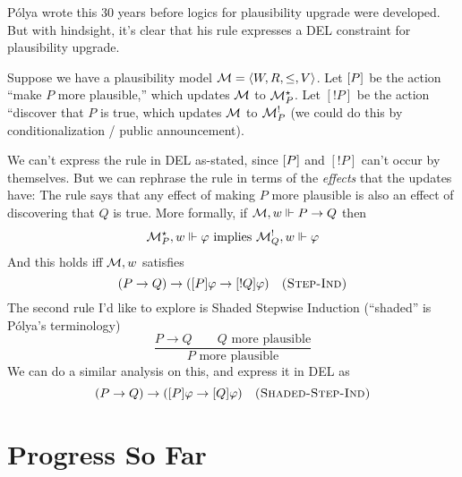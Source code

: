 \documentclass[letterpaper]{article}
\begin{document}
P\'{o}lya wrote this 30 years before logics for plausibility upgrade were developed.  But with hindsight, it's clear that his rule expresses a DEL constraint for plausibility upgrade.  

Suppose we have a plausibility model $\mathcal{M} = \langle W, R, \leq, V \rangle$.  Let $[P]$ be the action ``make $P$ more plausible,'' which updates $\mathcal{M}$ to $\mathcal{M}^{\star}_P$.  Let $[!P]$ be the action ``discover that $P$ is true, which updates $\mathcal{M}$ to $\mathcal{M}^{!}_P$ (we could do this by conditionalization / public announcement).

We can't express the rule in DEL as-stated, since $[P]$ and $[!P]$ can't occur by themselves.  But we can rephrase the rule in terms of the \emph{effects} that the updates have: The rule says that any effect of making $P$ more plausible is also an effect of discovering that $Q$ is true.  More formally, if $\mathcal{M}, w \Vdash P \to Q$ then
\[
    \mathcal{M}^{\star}_P, w \Vdash \varphi \mbox{ implies } \mathcal{M}^{!}_Q, w \Vdash \varphi
\]
And this holds iff $\mathcal{M}, w$ satisfies
\[
    (P \to Q) \to ([P] \varphi \to [!Q] \varphi) \quad \mbox{\textsc{(Step-Ind)}}
\]
The second rule I'd like to explore is Shaded Stepwise Induction (``shaded'' is P\'{o}lya's terminology)
\[
    \frac{P \to Q \quad \quad Q \mbox{ more plausible}}{P \mbox{ more plausible}}
\]
We can do a similar analysis on this, and express it in DEL as
\[
    (P \to Q) \to ([P] \varphi \to [Q] \varphi) \quad \mbox{\textsc{(Shaded-Step-Ind)}}
\]

\section*{Progress So Far}


\printbibliography
\end{document}
